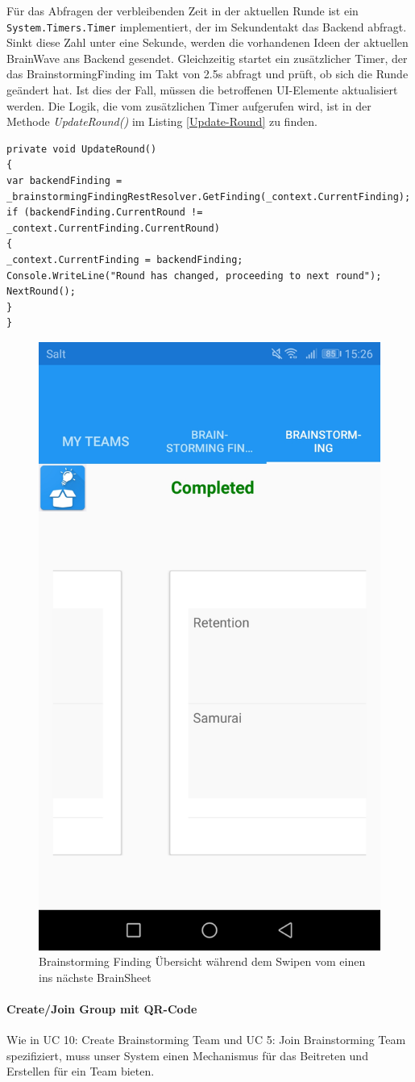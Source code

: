 Für das Abfragen der verbleibenden Zeit in der aktuellen Runde ist ein \texttt{System.{\-}Timers.Timer} implementiert, der im Sekundentakt das Backend abfragt. Sinkt diese Zahl unter eine Sekunde, werden die vorhandenen Ideen der aktuellen BrainWave ans Backend gesendet. Gleichzeitig startet ein zusätzlicher Timer, der das BrainstormingFinding im Takt von 2.5s abfragt und prüft, ob sich die Runde geändert hat. Ist dies der Fall, müssen die betroffenen UI-Elemente aktualisiert werden. Die Logik, die vom zusätzlichen Timer aufgerufen wird, ist in der Methode \textit{UpdateRound()} im Listing \ref{Update-Round} zu finden.


\begin{lstlisting}[label=Update-Round,caption=Poll-Mechanismus um zu prüfen ob Runde gewechselt hat]
private void UpdateRound()
{
var backendFinding = _brainstormingFindingRestResolver.GetFinding(_context.CurrentFinding);
if (backendFinding.CurrentRound != _context.CurrentFinding.CurrentRound)
{
_context.CurrentFinding = backendFinding;
Console.WriteLine("Round has changed, proceeding to next round");
NextRound();
}
}
\end{lstlisting}

\begin{figure}
	\centering
	\includegraphics[width=0.4\linewidth,height=0.4\textheight,keepaspectratio]{img/techn-bericht/brainstorming-overview}
	\caption{Brainstorming Finding Übersicht während dem Swipen vom einen ins nächste BrainSheet}
	\label{fig:brainstorming-overview}
\end{figure}

\paragraph*{Create/Join Group mit QR-Code}
Wie in UC 10: Create Brainstorming Team und UC 5: Join Brainstorming Team spezifiziert, muss unser System einen Mechanismus für das Beitreten und Erstellen für ein Team bieten. 

